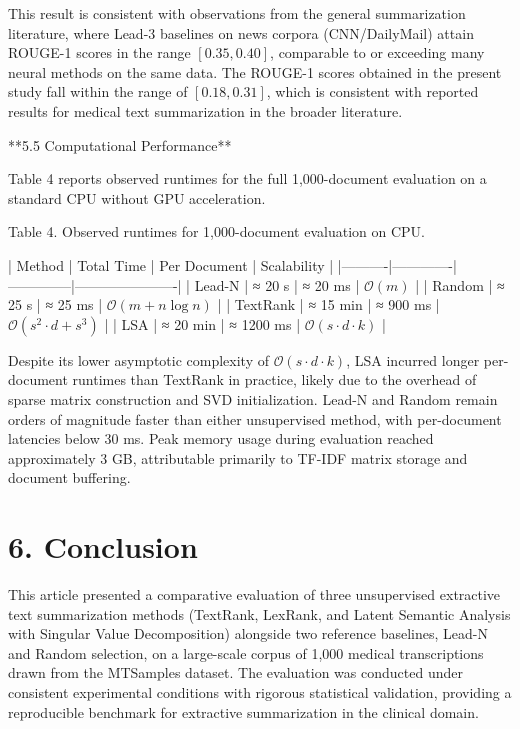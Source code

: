 \documentclass[10pt]{book}
\begin{document}
This result is consistent with observations from the general summarization literature, where Lead-3 baselines on news corpora (CNN/DailyMail) attain ROUGE-1 scores in the range $[0.35, 0.40]$, comparable to or exceeding many neural methods on the same data. The ROUGE-1 scores obtained in the present study fall within the range of $[0.18, 0.31]$, which is consistent with reported results for medical text summarization in the broader literature.

**5.5 Computational Performance**

Table 4 reports observed runtimes for the full 1,000-document evaluation on a standard CPU without GPU acceleration.

Table 4. Observed runtimes for 1,000-document evaluation on CPU.

| Method   | Total Time  | Per Document | Scalability          |
|----------|-------------|--------------|----------------------|
| Lead-N   | ≈ 20 s      | ≈ 20 ms      | $\mathcal{O}(m)$               |
| Random   | ≈ 25 s      | ≈ 25 ms      | $\mathcal{O}(m + n \log{n})$       |
| TextRank | ≈ 15 min    | ≈ 900 ms     | $\mathcal{O}(s^{2} \cdot d + s^{3})$   |
| LSA      | ≈ 20 min    | ≈ 1200 ms    | $\mathcal{O}(s \cdot d \cdot k)$        |

Despite its lower asymptotic complexity of $\mathcal{O}(s \cdot d \cdot k)$, LSA incurred longer per-document runtimes than TextRank in practice, likely due to the overhead of sparse matrix construction and SVD initialization. Lead-N and Random remain orders of magnitude faster than either unsupervised method, with per-document latencies below 30 ms. Peak memory usage during evaluation reached approximately 3 GB, attributable primarily to TF-IDF matrix storage and document buffering.

\section{6. Conclusion}

This article presented a comparative evaluation of three unsupervised extractive text summarization methods (TextRank, LexRank, and Latent Semantic Analysis with Singular Value Decomposition) alongside two reference baselines, Lead-N and Random selection, on a large-scale corpus of 1,000 medical transcriptions drawn from the MTSamples dataset. The evaluation was conducted under consistent experimental conditions with rigorous statistical validation, providing a reproducible benchmark for extractive summarization in the clinical domain.
\end{document}
